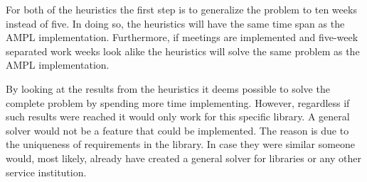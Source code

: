 For both of the heuristics the first step is to generalize the problem to ten weeks instead of five. In doing so, the heuristics will have the same time span as the AMPL implementation. Furthermore, if meetings are implemented and five-week separated work weeks look alike the heuristics will solve the same problem as the AMPL implementation. 

By looking at the results from the heuristics it deems possible to solve the complete problem by spending more time implementing. However, regardless if such results were reached it would only work for this specific library. A general solver would not be a feature that could be implemented. The reason is due to the uniqueness of requirements in the library. In case they were similar someone would, most likely, already have created a general solver for libraries or any other service institution.